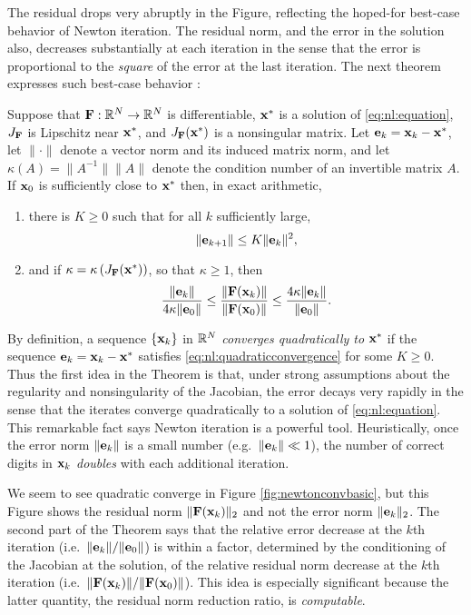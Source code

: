 The residual drops very abruptly in the Figure, reflecting the hoped-for best-case behavior of Newton iteration.  The residual norm, and the error in the solution also, decreases substantially at each iteration in the sense that the error is proportional to the \emph{square} of the error at the last iteration.  The next theorem expresses such best-case behavior \citep[Theorems 1.1 and inequalities (1.13)]{Kelley2003}:

\begin{theorem}
Suppose that $\mathbf{F}:\mathbb{R}^N\to\mathbb{R}^N$ is differentiable, $\mathbf{x}^*$ is a solution of \eqref{eq:nl:equation}, $J_{\mathbf{F}}$ is Lipschitz near $\mathbf{x}^*$, and $J_{\mathbf{F}}(\mathbf{x}^*)$ is a nonsingular matrix.  Let $\mathbf{e}_k=\mathbf{x}_k-\mathbf{x}^*$, let $\|\cdot\|$ denote a vector norm and its induced matrix norm, and let $\kappa(A)=\|A^{-1}\| \|A\|$ denote the condition number of an invertible matrix $A$.  If $\mathbf{x}_0$ is sufficiently close to $\mathbf{x}^*$ then, in exact arithmetic,
\renewcommand{\labelenumi}{(\roman{enumi})}
\begin{enumerate}
\item there is $K\ge 0$ such that for all $k$ sufficiently large,
\begin{equation}
	\|\mathbf{e}_{k+1}\| \le K \|\mathbf{e}_k\|^2, \label{eq:nl:quadraticconvergence}
\end{equation}
\item and if $\kappa = \kappa\left(J_{\mathbf{F}}(\mathbf{x}^*)\right)$, so that $\kappa\ge 1$, then
	$$\frac{\|\mathbf{e}_k\|}{4 \kappa \|\mathbf{e}_0\|} \le \frac{\|\mathbf{F}(\mathbf{x}_k)\|}{\|\mathbf{F}(\mathbf{x}_0)\|} \le \frac{4 \kappa \|\mathbf{e}_k\|}{\|\mathbf{e}_0\|}.$$
\end{enumerate}
\end{theorem}

By definition, a sequence $\{\mathbf{x}_k\}$ in $\mathbb{R}^N$ \emph{converges quadratically to} $\mathbf{x}^*$ if the sequence $\mathbf{e}_k=\mathbf{x}_k-\mathbf{x}^*$ satisfies \eqref{eq:nl:quadraticconvergence} for some $K\ge 0$.  Thus the first idea in the Theorem is that, under strong assumptions about the regularity and nonsingularity of the Jacobian, the error decays very rapidly in the sense that the iterates converge quadratically to a solution of \eqref{eq:nl:equation}.  This remarkable fact says Newton iteration is a powerful tool.  Heuristically, once the error norm $\|\mathbf{e}_k\|$ is a small number (e.g.~$\|\mathbf{e}_k\| \ll 1$), the number of correct digits in $\mathbf{x}_k$ \emph{doubles} with each additional iteration.

We seem to see quadratic converge in Figure \ref{fig:newtonconvbasic}, but this Figure shows the residual norm $\|\mathbf{F}(\mathbf{x}_k)\|_2$ and not the error norm $\|\mathbf{e}_k\|_2$.  The second part of the Theorem says that the relative error decrease at the $k$th iteration (i.e.~$\|\mathbf{e}_k\|/\|\mathbf{e}_0\|$) is within a factor, determined by the conditioning of the Jacobian at the solution, of the relative residual norm decrease at the $k$th iteration (i.e.~$\|\mathbf{F}(\mathbf{x}_k)\|/\|\mathbf{F}(\mathbf{x}_0)\|$).  This idea is especially significant because the latter quantity, the residual norm reduction ratio, is \emph{computable}.

